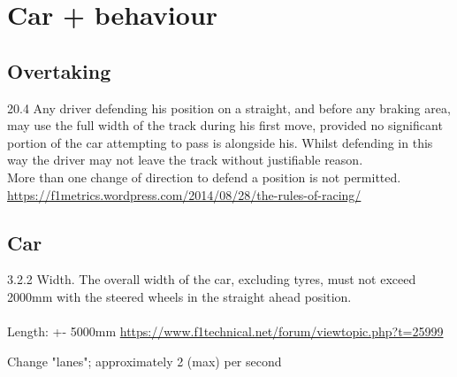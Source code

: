 \documentclass{article}
\begin{document}
\section{Car + behaviour}

\subsection{Overtaking}
20.4 Any driver defending his position on a straight, and before any braking area, may use the full width of the track during his first move, provided no significant portion of the car attempting to pass is alongside his. Whilst defending in this way the driver may not leave the track without justifiable reason.\\

 More than one change of direction to defend a position is not permitted.\\
\noindent
\url{https://f1metrics.wordpress.com/2014/08/28/the-rules-of-racing/}

\subsection{Car}
3.2.2 Width. The overall width of the car, excluding tyres, must not exceed 2000mm with the steered wheels in the straight ahead position.\\
\noindent
\href{3.\_formula\_one\_-\_technical\_regulations\_-\_2017.pdf}\\

\noindent
Length: +- 5000mm \url{https://www.f1technical.net/forum/viewtopic.php?t=25999}

Change "lanes"; approximately 2 (max) per second
\end{document}
